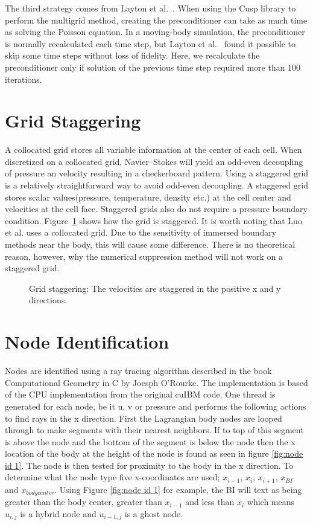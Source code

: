 \documentclass[onehalf,11pt]{beavtex}
\begin{document}
The third strategy comes from Layton et al.~\cite{layton2011cuibm}.
When using the Cusp library to perform the multigrid method, creating the preconditioner can take as much time as solving the Poisson equation.
In a moving-body simulation, the preconditioner is normally recalculated each time step, but Layton et al.~\cite{layton2011cuibm} found it possible to skip some time steps without loss of fidelity.
Here, we recalculate the preconditioner only if solution of the previous time step required more than 100 iterations.

\section{Grid Staggering}
\label{Grid Staggering}

A collocated grid stores all variable information at the center of each cell.
When discretized on a collocated grid, Navier--Stokes will yield an odd-even decoupling of pressure an velocity resulting in a checkerboard pattern. 
Using a staggered grid is a relatively straightforward way to avoid odd-even decoupling.
A staggered grid stores scalar values(pressure, temperature, density etc.) at the cell center and velocities at the cell face. 
Staggered grids also do not require a pressure boundary condition.
Figure~\ref{fig:stagger} shows how the grid is staggered.
It is worth noting that Luo et al.\cite{Luo:2012gx} uses a collocated grid.
Due to the sensitivity of immersed boundary methods near the body, this will cause some difference.
There is no theoretical reason, however, why the numerical suppression method will not work on a staggered grid.
\begin{figure}[htb]
	\centering
	
	\caption{Grid staggering: The velocities are staggered in the positive x and y directions.}
	\label{fig:stagger}
\end{figure}

\section{Node Identification}
Nodes are identified using a ray tracing algorithm described in the book Computational Geometry in C by Joesph O'Rourke\cite{o1998computational}.
The implementation is based of the CPU implementation from the original cuIBM code.
One thread is generated for each node, be it u, v or pressure and performs the following actions to find rays in the x direction.
First the Lagrangian body nodes are looped through to make segments with their nearest neighbors.
If to top of this segment is above the node and the bottom of the segment is below the node then the x location of the body at the height of the node is found as seen in figure \ref{fig:node id 1}.
The node is then tested for proximity to the body in the x direction.
To determine what the node type five x-coordinates are used; $x_{i-1}$, $x_{i}$, $x_{i+1}$, $x_{BI}$ and $x_{body center}$.
Using Figure \ref{fig:node id 1} for example, the BI will text as being greater than the body center, greater than $x_{i-1}$ and less than $x_{i}$ which means $u_{i,j}$ is a hybrid node and $u_{i-1,j}$ is a ghost node.
\end{document}
